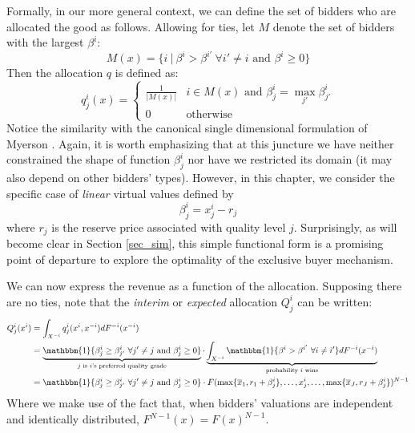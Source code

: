 Formally, in our more general context, we can define the set of bidders who are allocated the good as follows. Allowing for ties, let $M$ denote the set of bidders with the largest $\beta^i$:
\begin{equation}
    M(x) = \{ i \ | \ \beta^i > \beta^{i'} \ \forall i' \neq i \text{ and } \beta^i \geq 0 \}
\end{equation}
\noindent Then the allocation $q$ is defined as:
\begin{equation}
    q_j^i(x) = \begin{cases}
        \frac{1}{|M(x)|} & i \in M(x) \text{ and } \beta_j^i = \max_{j'} \beta_{j'}^i \\
        0 & \text{otherwise}
    \end{cases}
\end{equation}
\noindent Notice the similarity with the canonical single dimensional formulation of Myerson \autocite*{myerson1981optimal}. Again, it is worth emphasizing that at this juncture we have neither constrained the shape of function $\beta_j^i$ nor have we restricted its domain (it may also depend on other bidders' types). However, in this chapter, we consider the specific case of \textit{linear} virtual values defined by
\begin{equation}
    \beta_j^i = x_j^i - r_j
\end{equation}
\noindent where $r_j$ is the reserve price associated with quality level $j$. Surprisingly, as will become clear in Section \ref{sec_sim}, this simple functional form is a promising point of departure to explore the optimality of the exclusive buyer mechanism. 

We can now express the revenue as a function of the allocation. Supposing there are no ties, note that the \textit{interim} or \textit{expected} allocation $Q_j^i$ can be written:
\begin{align}
    Q_j^i(x^i) &= \int_{X^{-i}} q_j^i(x^i,x^{-i}) dF^{-i}(x^{-i}) \\
        &= \underbrace{\mathbbm{1} \{ \beta_j^i \geq \beta_{j'}^i \ \forall j' \neq j \text{ and } \beta_j^i \geq 0 \}}_{\text{$j$ is $i$'s preferred quality grade}} \cdot \underbrace{\int_{X^{-i}} \mathbbm{1} \{ \beta^i > \beta^{i'} \ \forall i \neq i' \} dF^{-i}(x^{-i})}_{\text{probability $i$ wins}} \\
        &= \mathbbm{1} \{ \beta_j^i \geq \beta_{j'}^i \ \forall j' \neq j \text{ and } \beta_j^i \geq 0 \} \cdot F(\max \{ \overline{x}_1, r_1 + \beta_j^i \}, \dots, x_j^i, \dots, \max \{ \overline{x}_J, r_J + \beta_j^i \})^{N-1}
\end{align}
\noindent Where we make use of the fact that, when bidders' valuations are independent and identically distributed, $F^{N-1}(x) = F(x)^{N-1}$. 

